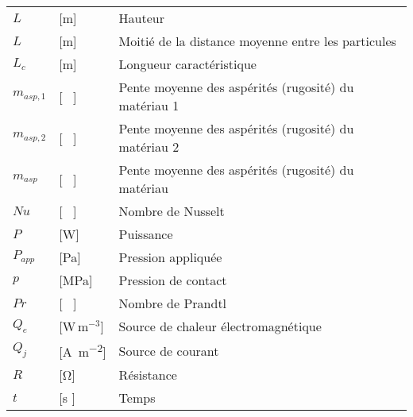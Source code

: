 \begin{longtable}{l p{2.5cm} p{4in}}
	$L$              & [\si{\metre}]                                       & Hauteur                                                      \\
	$L$              & [\si{\metre}]                                       & Moitié de la distance moyenne entre les particules           \\
	$L_c$            & [\si{\metre}]                                       & Longueur caractéristique                                     \\
	$m_{asp,1}$      & [ \ ]                                               & Pente moyenne des aspérités (rugosité) du matériau 1         \\
	$m_{asp,2}$      & [ \ ]                                               & Pente moyenne des aspérités (rugosité) du matériau 2         \\
	$m_{asp}$        & [ \ ]                                               & Pente moyenne des aspérités (rugosité) du matériau           \\
	$Nu$             & [ \ ]                                               & Nombre de Nusselt                                            \\
	$P$              & [\si{\watt}]                                        & Puissance                                                    \\
	$P_{app}$        & [\si{\pascal}]                                      & Pression appliquée                                           \\
	$p$              & [\si{\mega\pascal}]                                 & Pression de contact                                          \\
	$Pr$             & [ \ ]                                               & Nombre de Prandtl                                            \\
	$Q_e$            & [W\,m$^{-3}$]                                       & Source de chaleur électromagnétique                          \\
	$Q_j$            & [\si{\ampere\per\square\metre}]                     & Source de courant                                            \\
	$R$              & [\si{\ohm}]                                         & Résistance                                                   \\
	$t$              & [\si{\second} ]                                     & Temps                                                        \\

\end{longtable}
